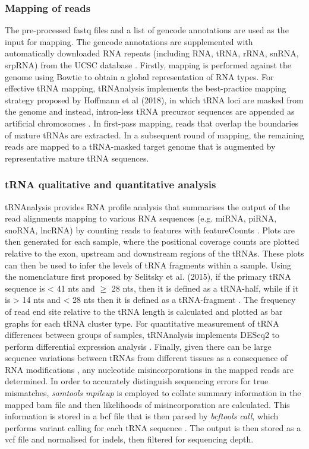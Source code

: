 \subsubsection{Mapping of reads}
The pre-processed fastq files and a list of gencode annotations are used as the input for mapping.
The gencode annotations are supplemented with automatically downloaded RNA repeats (including RNA, tRNA, rRNA, snRNA, srpRNA) from the UCSC database \cite{karolchik2004ucsc}.
Firstly, mapping is performed against the genome using Bowtie \cite{langmead2009ultrafast} to obtain a global representation of RNA types.
For effective tRNA mapping, tRNAnalysis implements the best-practice mapping strategy proposed by Hoffmann et al (2018), in which tRNA loci are masked from the genome and instead, intron-less tRNA precursor sequences are appended as artificial chromosomes \cite{hoffmann2018accurate}.
In first-pass mapping, reads that overlap the boundaries of mature tRNAs are extracted.
In a subsequent round of mapping, the remaining reads are mapped to a tRNA-masked target genome that is augmented by representative mature tRNA sequences.

\subsubsection{tRNA qualitative and quantitative analysis}
tRNAnalysis provides RNA profile analysis that summarises the output of the read alignments mapping to various RNA sequences (e.g. miRNA, piRNA, snoRNA, lncRNA) by counting reads to features with featureCounts \cite{liao2014featurecounts}.
Plots are then generated for each sample, where the positional coverage counts are plotted relative to the exon, upstream and downstream regions of the tRNAs.
These plots can then be used to infer the levels of tRNA fragments within a sample.
Using the nomenclature first proposed by Selitsky et al. (2015), if the primary tRNA sequence is < 41 nts and $\geq$ 28 nts, then it is defined as a tRNA-half, while if it is > 14 nts and < 28 nts then it is defined as a tRNA-fragment \cite{selitsky2015small}.
The frequency of read end site relative to the tRNA length is calculated and plotted as bar graphs for each tRNA cluster type.
For quantitative measurement of tRNA differences between groups of samples, tRNAnalysis implements DESeq2 to perform differential expression analysis \cite{love2014moderated}.
Finally, given there can be large sequence variations between tRNAs from different tissues as a consequence of RNA modifications \cite{hoffmann2018accurate, vilmi2005sequence, lin2019trnaviz}, any nucleotide misincorporations in the mapped reads are determined.
In order to accurately distinguish sequencing errors for true mismatches, \textit{samtools mpileup} is employed to collate summary information in the mapped bam file and then likelihoods of misincorporation are calculated.
This information is stored in a bcf file that is then parsed by \textit{bcftools call}, which performs variant calling for each tRNA sequence \cite{li2009sequence}.
The output is then stored as a vcf file and normalised for indels, then filtered for sequencing depth.

